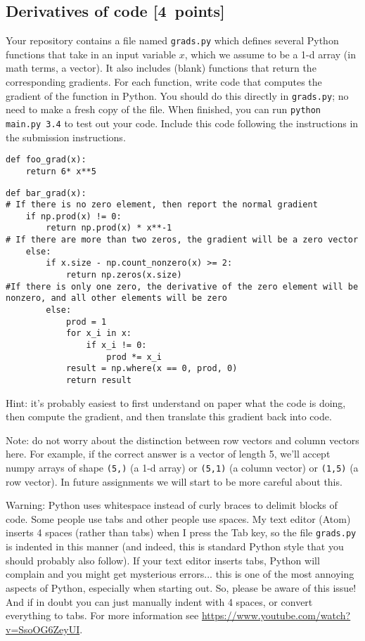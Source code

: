\documentclass{article}
\newcommand{\blu}[1]{{\textcolor{blu}{#1}}}
\let\ask\blu
\newcommand\pts[1]{\textcolor{pointscolour}{[#1~points]}}
\begin{document}
  \subsection{Derivatives of code \pts{4}}

  Your repository contains a file named \texttt{grads.py} which defines several Python functions that take in an input variable $x$, which we assume to be a 1-d array (in math terms, a vector).
  It also includes (blank) functions that return the corresponding gradients.
  For each function, \ask{write code that computes the gradient of the function} in Python.
  You should do this directly in \texttt{grads.py}; no need to make a fresh copy of the file. When finished, you can run \texttt{python main.py 3.4} to test out your code. \ask{Include this code following the instructions in the submission instructions.}

  \begin{verbatim}
def foo_grad(x):
    return 6* x**5
  \end{verbatim}
  \begin{verbatim}
def bar_grad(x):
# If there is no zero element, then report the normal gradient 
    if np.prod(x) != 0: 
        return np.prod(x) * x**-1
# If there are more than two zeros, the gradient will be a zero vector
    else:
        if x.size - np.count_nonzero(x) >= 2:
            return np.zeros(x.size)
#If there is only one zero, the derivative of the zero element will be nonzero, and all other elements will be zero
        else:
            prod = 1
            for x_i in x:
                if x_i != 0:
                    prod *= x_i
            result = np.where(x == 0, prod, 0)
            return result
  \end{verbatim}

  Hint: it's probably easiest to first understand on paper what the code is doing, then compute
  the gradient, and then translate this gradient back into code.

  Note: do not worry about the distinction between row vectors and column vectors here.
  For example, if the correct answer is a vector of length 5, we'll accept numpy arrays
  of shape \texttt{(5,)} (a 1-d array) or \texttt{(5,1)} (a column vector) or
  \texttt{(1,5)} (a row vector). In future assignments we will start to be more careful
  about this.

  Warning: Python uses whitespace instead of curly braces to delimit blocks of code.
  Some people use tabs and other people use spaces. My text editor (Atom) inserts 4 spaces (rather than tabs) when
  I press the Tab key, so the file \texttt{grads.py} is indented in this manner (and indeed, this is standard Python style that you should probably also follow). If your text editor inserts tabs,
  Python will complain and you might get mysterious errors... this is one of the most annoying aspects
  of Python, especially when starting out. So, please be aware of this issue! And if in doubt you can just manually
  indent with 4 spaces, or convert everything to tabs. For more information
  see \url{https://www.youtube.com/watch?v=SsoOG6ZeyUI}.
\end{document}
